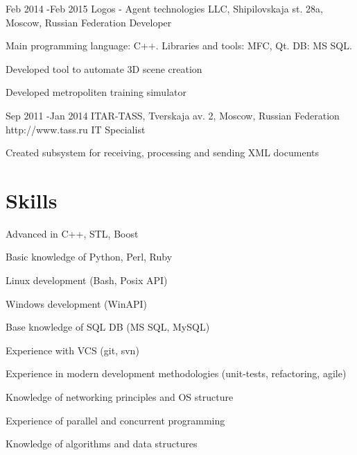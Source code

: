 \documentclass[10pt]{article} %
\begin{document}

\job
{Feb 2014 -}{Feb 2015}
{Logos - Agent technologies LLC, Shipilovskaja st. 28a, Moscow, Russian Federation}
{}
{Developer}
{
Main programming language: C++. Libraries and tools: MFC, Qt. DB: MS SQL.
\begin{itemize-noindent}
\setlength\itemsep{0em}
\item{Developed tool to automate 3D scene creation}
\item{Developed metropoliten training simulator}
\end{itemize-noindent}
}


\job
{Sep 2011 -}{Jan 2014}
{ITAR-TASS, Tverskaja av. 2, Moscow, Russian Federation}
{http://www.tass.ru}
{IT Specialist}
{
\begin{itemize-noindent}
\setlength\itemsep{0em}
\item{Created subsystem for receiving, processing and sending XML documents}
\end{itemize-noindent}
}


\section{Skills}

\begin{multicols}{2}
\begin{itemize-noindent}
\setlength\itemsep{0em}
\item Advanced in C++, STL, Boost
\item Basic knowledge of Python, Perl, Ruby
\item Linux development (Bash, Posix API)
\item Windows development (WinAPI)
\item Base knowledge of SQL DB (MS SQL, MySQL)
\item Experience with VCS (git, svn)
\item Experience in modern development methodologies (unit-tests, refactoring, agile)
\item Knowledge of networking principles and OS structure
\item Experience of parallel and concurrent programming
\item Knowledge of algorithms and data structures
\end{itemize-noindent}
\end{multicols}
\end{document}
